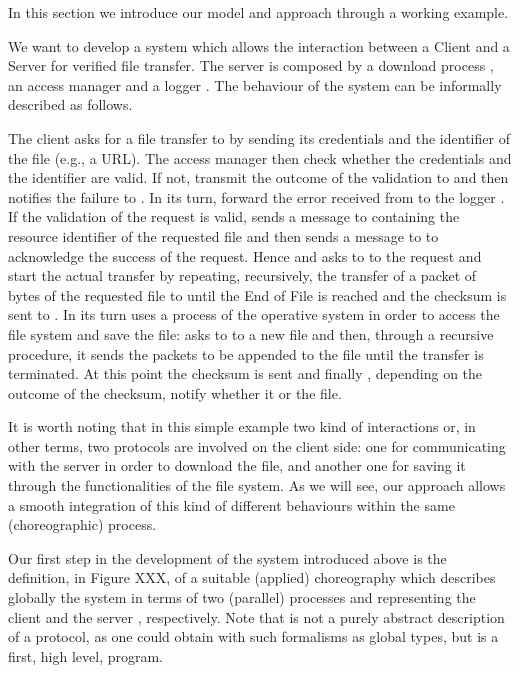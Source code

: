 

In this section we introduce our model and approach through a working example. 



We want to develop a system which allows the interaction between  a Client
 and a Server  for verified file transfer. The server is
composed by a download process , an access manager   and a
logger . The behaviour of the system can be informally described as
follows.

The client  asks for a file transfer to  by sending its
credentials and the identifier of the file (e.g., a URL). The access manager
 then check whether the credentials and the  identifier are valid. If
not,  transmit the outcome of the validation to  and then
notifies the failure  to . In its turn,   forward the error
received from  to the logger .
If the validation of the request is valid,  sends a message to  containing the resource identifier of the requested file and then sends a
message to   to acknowledge the success of the request. Hence  and
 asks to  to  the request and start the actual transfer
by repeating, recursively, the transfer of  a packet of bytes of the requested
file to  until the End of File is reached and  the checksum is sent to
. In its turn  uses a process   of the operative
system in order to access the file system and save the file:  asks to
 to  a new file and then, through a recursive procedure, it
sends the packets to be appended to the file until the transfer is terminated.
At this point  the checksum is sent and finally  , depending on the
outcome of the checksum,  notify   whether it  or 
the file.


It is worth noting that in this simple example two kind of interactions or, in
other terms, two protocols are involved on the client side: one for
communicating with the server in order to download the file, and another one
for saving it through the functionalities of the file system. As we will see,
our approach allows a smooth integration of this kind of different behaviours
within the same (choreographic) process.


Our first step in the development of the system introduced above is the
definition, in Figure XXX, of a suitable (applied) choreography which describes
globally the system in terms of two  (parallel) processes  and 
representing  the client   and the server , respectively.
Note that is not a purely abstract description of a protocol, as one could
obtain with such formalisms as global types, but is a first, high level,
program.

